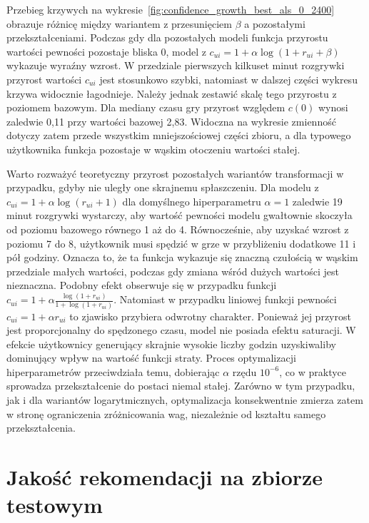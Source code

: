 
Przebieg krzywych na wykresie~\ref{fig:confidence_growth_best_als_0_2400} obrazuje różnicę między wariantem z przesunięciem $\beta$ a pozostałymi przekształceniami. Podczas gdy dla pozostałych modeli funkcja przyrostu wartości pewności pozostaje bliska 0, model z $c_{ui} = 1 + \alpha\log(1 + r_{ui} + \beta)$ wykazuje wyraźny wzrost. W przedziale pierwszych kilkuset minut rozgrywki przyrost wartości $c_{ui}$ jest stosunkowo szybki, natomiast w dalszej części wykresu krzywa widocznie łagodnieje. Należy jednak zestawić skalę tego przyrostu z poziomem bazowym. Dla mediany czasu gry przyrost względem $c(0)$ wynosi zaledwie 0,11 przy wartości bazowej 2,83. Widoczna na wykresie zmienność dotyczy zatem przede wszystkim mniejszościowej części zbioru, a dla typowego użytkownika funkcja pozostaje w wąskim otoczeniu wartości stałej.

Warto rozważyć teoretyczny przyrost pozostałych wariantów transformacji w przypadku, gdyby nie uległy one skrajnemu spłaszczeniu. Dla modelu z $c_{ui} = 1 + \alpha \log(r_{ui} + 1)$ dla domyślnego hiperparametru $\alpha = 1$ zaledwie 19 minut rozgrywki wystarczy, aby wartość pewności modelu gwałtownie skoczyła od poziomu bazowego równego 1 aż do 4. Równocześnie, aby uzyskać wzrost z poziomu 7 do 8, użytkownik musi spędzić w grze w przybliżeniu dodatkowe 11 i pół godziny. Oznacza to, że ta funkcja wykazuje się znaczną czułością w wąskim przedziale małych wartości, podczas gdy zmiana wśród dużych wartości jest nieznaczna. Podobny efekt obserwuje się w przypadku funkcji
$c_{ui} = 1 + \alpha \frac{\log(1 + r_{ui})}{1 + \log(1 + r_{ui})}$. Natomiast w przypadku liniowej funkcji pewności $c_{ui} = 1 + \alpha r_{ui}$ to zjawisko przybiera odwrotny charakter. Ponieważ jej przyrost jest proporcjonalny do spędzonego czasu, model nie posiada efektu saturacji. W efekcie użytkownicy generujący skrajnie wysokie liczby godzin uzyskiwaliby dominujący wpływ na wartość funkcji straty. Proces optymalizacji hiperparametrów przeciwdziała temu, dobierając $\alpha$ rzędu $10^{-6}$, co w praktyce sprowadza przekształcenie do postaci niemal stałej. Zarówno w tym przypadku, jak i dla wariantów logarytmicznych, optymalizacja konsekwentnie zmierza zatem w stronę ograniczenia zróżnicowania wag, niezależnie od kształtu samego przekształcenia.

\section{Jakość rekomendacji na zbiorze testowym}


